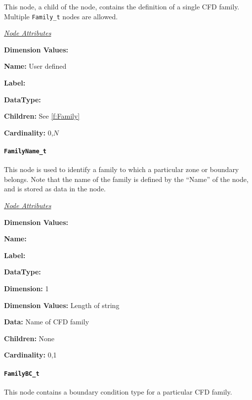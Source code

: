 This node, a child of the  node, contains the
definition of a single CFD family.
Multiple \texttt{Family\_t} nodes are allowed.

\textit{\uline{Node Attributes}}
\begin{Ventryic}{\textbf{Dimension Values:}}
\item [\textbf{Name:}]
      User defined
\item [\textbf{Label:}]
\item [\textbf{DataType:}]
\item [\textbf{Children:}]
      See \autoref{f:Family}
\item [\textbf{Cardinality:}]
      0,$N$
\end{Ventryic}

\paragraph{\texttt{FamilyName\_t}}

This node is used to identify a family to which
a particular zone or boundary belongs.
Note that the name of the family is defined by the ``Name''
of the  node, and is stored as data in the
 node.

\textit{\uline{Node Attributes}}
\begin{Ventryic}{\textbf{Dimension Values:}}
\item [\textbf{Name:}]
\item [\textbf{Label:}]
\item [\textbf{DataType:}]
\item [\textbf{Dimension:}]
      1
\item [\textbf{Dimension Values:}]
      Length of string
\item [\textbf{Data:}]
      Name of CFD family
\item [\textbf{Children:}]
      None
\item [\textbf{Cardinality:}]
      0,1
\end{Ventryic}

\paragraph{\texttt{FamilyBC\_t}}

This node contains a boundary condition type for a
particular CFD family.

